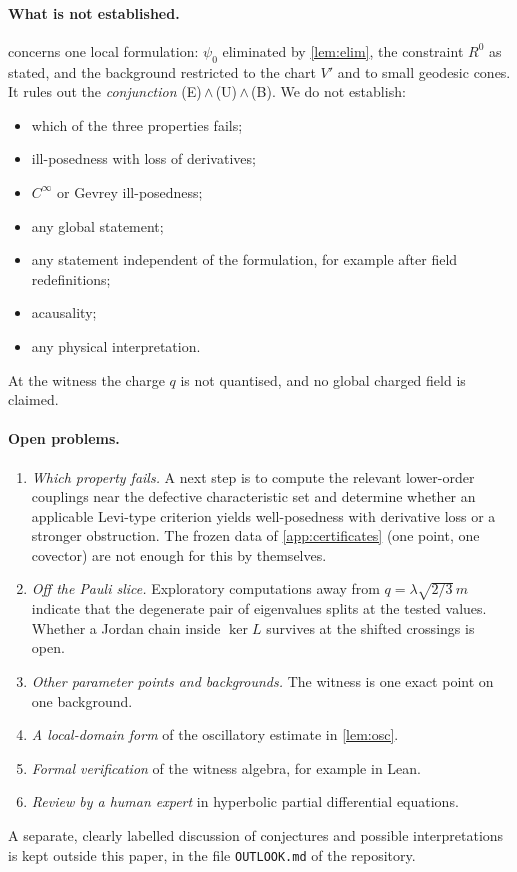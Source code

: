 \documentclass[11pt]{article}
\theoremstyle{plain}
\theoremstyle{definition}
\theoremstyle{remark}
\begin{document}
\paragraph{What is not established.}
 concerns one local formulation: $\psi_0$ eliminated by \cref{lem:elim}, the constraint $R^0$ as stated, and the background restricted to the chart $V'$ and to small geodesic cones. It rules out the \emph{conjunction} (E)\,$\wedge$\,(U)\,$\wedge$\,(B). We do not establish:
\begin{itemize}
  \item which of the three properties fails;
  \item ill-posedness with loss of derivatives;
  \item $C^\infty$ or Gevrey ill-posedness;
  \item any global statement;
  \item any statement independent of the formulation, for example after field redefinitions;
  \item acausality;
  \item any physical interpretation.
\end{itemize}
At the witness the charge $q$ is not quantised, and no global charged field is claimed.

\paragraph{Open problems.}
\begin{enumerate}
  \item \emph{Which property fails.} A next step is to compute the relevant lower-order couplings near the defective characteristic set and determine whether an applicable Levi-type criterion yields well-posedness with derivative loss or a stronger obstruction. The frozen data of \cref{app:certificates} (one point, one covector) are not enough for this by themselves.
  \item \emph{Off the Pauli slice.} Exploratory computations away from $q = \lambda\sqrt{2/3}\,m$ indicate that the degenerate pair of eigenvalues splits at the tested values. Whether a Jordan chain inside $\ker L$ survives at the shifted crossings is open.
  \item \emph{Other parameter points and backgrounds.} The witness is one exact point on one background.
  \item \emph{A local-domain form} of the oscillatory estimate in \cref{lem:osc}.
  \item \emph{Formal verification} of the witness algebra, for example in Lean.
  \item \emph{Review by a human expert} in hyperbolic partial differential equations.
\end{enumerate}
A separate, clearly labelled discussion of conjectures and possible interpretations is kept outside this paper, in the file \texttt{OUTLOOK.md} of the repository.
\end{document}
